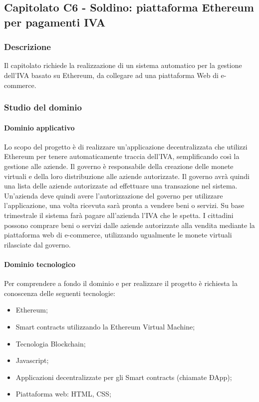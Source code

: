 		
	\subsection{Capitolato C6 - Soldino: piattaforma Ethereum per pagamenti IVA}
		\subsubsection{Descrizione}
		Il capitolato richiede la realizzazione di un sistema automatico per la gestione dell’IVA basato su Ethereum, da collegare ad una piattaforma Web di e-commerce.
		\subsubsection{Studio del dominio}
			\paragraph{Dominio applicativo} 
			Lo scopo del progetto è di realizzare un’applicazione decentralizzata che utilizzi Ethereum per tenere automaticamente traccia dell’IVA, semplificando così la gestione alle aziende.
Il governo è responsabile della creazione delle monete virtuali e della loro distribuzione alle aziende autorizzate. Il governo avrà quindi una lista delle aziende autorizzate ad effettuare una transazione nel sistema.
Un’azienda deve quindi avere l’autorizzazione del governo per utilizzare l’applicazione, una volta ricevuta sarà pronta a vendere beni o servizi. Su base trimestrale il sistema farà pagare all’azienda l’IVA che le spetta.
I cittadini possono comprare beni o servizi dalle aziende autorizzate alla vendita mediante la piattaforma web di e-commerce, utilizzando ugualmente le monete virtuali rilasciate dal governo.
			\paragraph{Dominio tecnologico}
			Per comprendere a fondo il dominio e per realizzare il progetto è richiesta la conoscenza delle seguenti tecnologie:
			\begin{itemize}
				\item Ethereum;
				\item Smart contracts utilizzando la Ethereum Virtual Machine;
				\item Tecnologia Blockchain;
				\item Javascript;
				\item Applicazioni decentralizzate per gli Smart contracts (chiamate ÐApp);
				\item Piattaforma web: HTML, CSS;
			\end{itemize}
